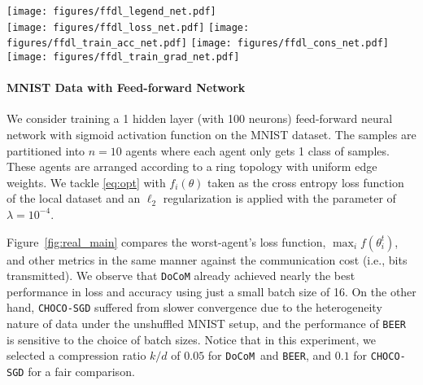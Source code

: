 \documentclass[10pt]{article} %
\newcommand{\revision}{}
\theoremstyle{plain}
\theoremstyle{definition}
\theoremstyle{remark}
\newcommand{\aname}{{\tt DoCoM}}
\begin{document}
\begin{figure*}
    \centering 
    \texttt{[image: figures/ffdl\_legend\_net.pdf]}\\
    \texttt{[image: figures/ffdl\_loss\_net.pdf]}
    \texttt{[image: figures/ffdl\_train\_acc\_net.pdf]}
    \texttt{[image: figures/ffdl\_cons\_net.pdf]}
    \texttt{[image: figures/ffdl\_train\_grad\_net.pdf]}
    \caption{\textbf{Experiments on MNIST Data with Feed-forward Network.} Worst-agent's train loss values, train accuracy, consensus gap and train gradient norm against the number of bits transmitted.} \label{fig:real_main}
\end{figure*}



\paragraph{MNIST Data with Feed-forward Network}
We consider training a 1 hidden layer (with 100 neurons) feed-forward neural network with sigmoid activation function on the MNIST dataset. The samples are partitioned into $n=10$ agents where each agent only {\revision gets} 1 class of samples. These agents are arranged according to a ring topology with uniform edge weights. We tackle \eqref{eq:opt} with $f_i(\theta)$ taken as the cross entropy loss function of the local dataset and an $\ell_2$ regularization is applied with the parameter of $\lambda = 10^{-4}$. 

Figure~\ref{fig:real_main} compares the worst-agent's loss function, $\max_i f( \theta_i^t )$, and other metrics in the same manner against the communication cost (i.e., bits transmitted). We observe that {\aname} already achieved nearly the best performance in loss and accuracy using just a small batch size {\revision of 16}. On the other hand, {\tt CHOCO-SGD} suffered from slower convergence due to the heterogeneity nature of data under the unshuffled MNIST setup, {\revision and the performance of {\tt BEER} is sensitive to the choice of batch sizes}.
Notice that in this experiment, we selected a compression ratio $k/d$ of $0.05$ for \aname~and {\tt BEER}, and $0.1$ for {\tt CHOCO-SGD} for a fair comparison. 
\end{document}
